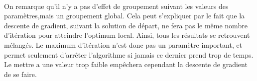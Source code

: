 \documentclass[12pt]{article}
\begin{document}
\begin{figure}[!h]
\begin{floatrow}
\end{floatrow}
\end{figure}

\paragraph{}On remarque qu'il n'y a pas d'effet de groupement suivant les valeurs des paramètres,mais un groupement global. Cela peut s'expliquer par le fait que la descente de gradient, suivant la solution de départ, ne fera pas le même nombre d'itération pour atteindre l'optimum local. Ainsi, tous les résultats se retrouvent mélangés. Le maximum d'itération n'est donc pas un paramètre important, et permet seulement d'arrêter l'algorithme si jamais ce dernier prend trop de temps. Le mettre a une valeur trop faible empêchera cependant la descente de gradient de se faire.
\end{document}
